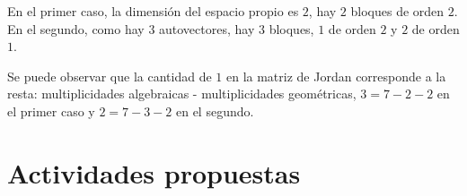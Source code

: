 \begin{example}
\bigskip

En el primer caso, la dimensión del espacio propio  es $2$, hay $2$ bloques de orden $2$. En el segundo,  como hay $3$ autovectores, hay $3$ bloques, $1$ de orden $2$ y $2$ de orden $1$.

\bigskip

Se puede observar que la cantidad de $1$ en la matriz de Jordan corresponde a la resta: multiplicidades algebraicas - multiplicidades geométricas, $3= 7 - 2-2 $ en el primer caso y $2= 7 -3-2$ en el segundo.

\end{example}



\bigskip


\newpage


  



\section{Actividades propuestas}



